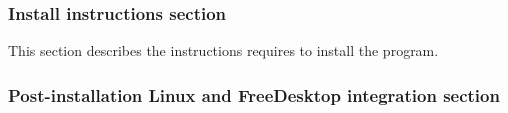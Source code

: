 \vspace{-0.25cm}
\subsubsection{Install instructions section}
\label{rpminst}

This section describes the instructions requires to install the program. 
{\footnotesize{
\begin{script}
\end{script}
}}
\vspace{-1cm}
{\footnotesize{
\begin{script}
\end{script}
}}
\vspace{-1cm}
{\footnotesize{
\begin{script}
\end{script}
}}


\subsubsection{Post-installation Linux and FreeDesktop integration section}
\label{rpmpost}

